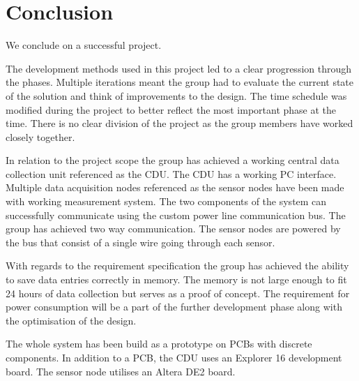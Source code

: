 \chapter{Conclusion}
We conclude on a successful project. 

The development methods used in this project led to a clear progression through the phases. Multiple iterations meant the group had to evaluate the current state of the solution and think of improvements to the design. The time schedule was modified during the project to better reflect the most important phase at the time. There is no clear division of the project as the group members have worked closely together.

In relation to the project scope the group has achieved a working central data collection unit referenced as the CDU. The CDU has a working PC interface. Multiple data acquisition nodes referenced as the sensor nodes have been made with working measurement system. The two components of the system can successfully communicate using the custom power line communication bus. The group has achieved two way communication. The sensor nodes are powered by the bus that consist of a single wire going through each sensor.

With regards to the requirement specification the group has achieved the ability to save data entries correctly in memory. The memory is not large enough to fit 24 hours of data collection but serves as a proof of concept. The requirement for power consumption will be a part of the further development phase along with the optimisation of the design.

The whole system has been build as a prototype on PCBs with discrete components. In addition to a PCB, the CDU uses an Explorer 16 development board. The sensor node utilises an Altera DE2 board.